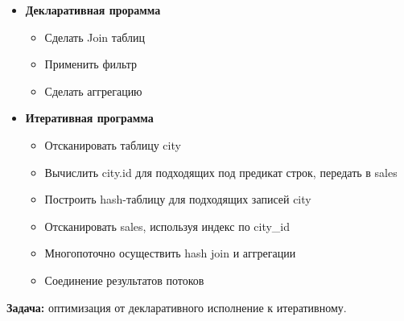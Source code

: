 \documentclass[11pt]{article}
\begin{document}
    \begin{itemize}
        \item \textbf{Декларативная прорамма}
        \begin{itemize}
            \item Сделать Join таблиц
            \item Применить фильтр
            \item Сделать аггрегацию
        \end{itemize}
        \item \textbf{Итеративная программа}
        \begin{itemize}
            \item Отсканировать таблицу city
            \item Вычислить city.id для подходящих под предикат строк, передать в sales
            \item Построить hash-таблицу для подходящих записей city
            \item Отсканировать sales, используя индекс по city\_id
            \item Многопоточно осуществить hash join и аггрегации
            \item Соединение результатов потоков
        \end{itemize}
    \end{itemize}

    \textbf{Задача:} оптимизация от декларативного исполнение к итеративному.
\end{document}

